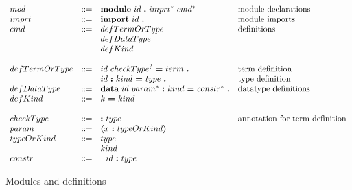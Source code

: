 \documentclass{article}
\begin{document}
\begin{figure}[h]
  \[
    \begin{array}{llll}
      \\ mod
      & ::= & \textbf{module}\ id\ \textbf{.}\ imprt^*\ cmd^*\
      & \textnormal{module declarations}
      \\ imprt
      & ::= & \textbf{import}\ id\ \textbf{.}
      & \textnormal{module imports}
      \\ cmd
      & ::= & defTermOrType
      & \textnormal{definitions}
      \\ & & defDataType
      \\ & & defKind
      \\ 
      \\ defTermOrType
      & ::= & id\ checkType^?\ \textbf{=}\ term\ \textbf{.}
      & \textnormal{term definition}
      \\ & & id\ \textbf{:}\ kind\ \textbf{=}\ type\ \textbf{.}
      & \textnormal{type definition}
      \\ defDataType
      & ::= & \textbf{data}\ id\ param^*\ \textbf{:}\ kind\ \textbf{=}\
              constr^*\ \textbf{.}
      & \textnormal{datatype definitions}
      \\ defKind
      & ::= & k\ \textbf{=}\ kind
      \\ 
      \\ checkType
      & ::= & \textbf{:}\ type
      & \textnormal{annotation for term definition}
      \\ param
      & ::= & \textbf{(}x\ \textbf{:}\ typeOrKind \textbf{)}
      \\ typeOrKind
      & ::= & type
      \\ & & kind
      \\ constr
      & ::= & \textbf{\textbar}\ id\ \textbf{:}\ type
    \end{array}
  \]
  \caption{Modules and definitions}
\end{figure}
\end{document}
